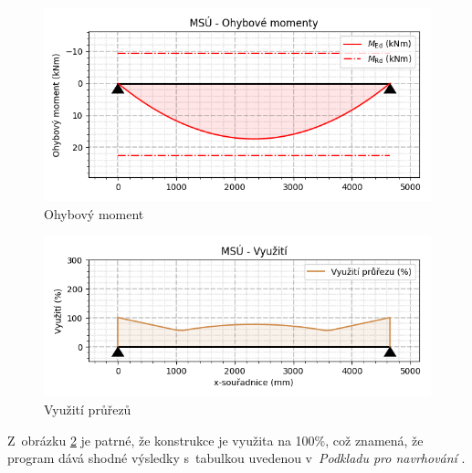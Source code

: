 \begin{figure}[H]
    \includegraphics{assets/figures/wbapp/strop/11_moment.png}
    \caption{Ohybový moment}
    \label{fig:wb_app_moment}
\end{figure}

\begin{figure}[H]
    \includegraphics{assets/figures/wbapp/strop/12_vyuziti.png}
    \caption{Využití průřezů}
    \label{fig:wb_app_vyuziti}
\end{figure}

Z~obrázku \ref{fig:wb_app_vyuziti} je patrné, že konstrukce je využita na 100\%, což znamená, že program dává shodné výsledky s~tabulkou uvedenou v~\textit{Podkladu pro navrhování} \cite{PPN17}. 


